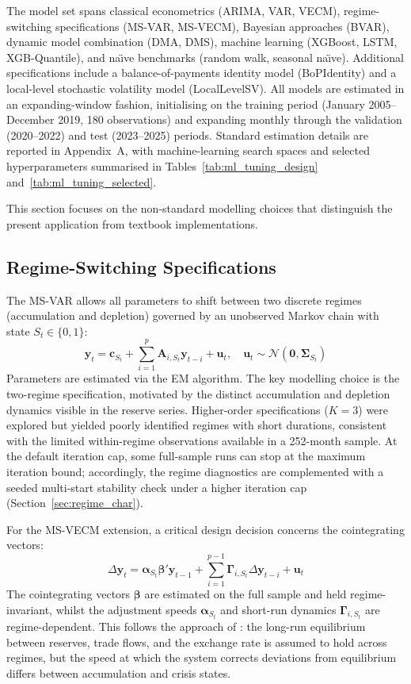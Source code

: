 \documentclass[12pt,a4paper]{article}
\begin{document}
The model set spans classical econometrics (ARIMA, VAR, VECM), regime-switching specifications (MS-VAR, MS-VECM), Bayesian approaches (BVAR), dynamic model combination (DMA, DMS), machine learning (XGBoost, LSTM, XGB-Quantile), and na\"{\i}ve benchmarks (random walk, seasonal na\"{\i}ve). Additional specifications include a balance-of-payments identity model (BoPIdentity) and a local-level stochastic volatility model (LocalLevelSV). All models are estimated in an expanding-window fashion, initialising on the training period (January 2005--December 2019, 180 observations) and expanding monthly through the validation (2020--2022) and test (2023--2025) periods. Standard estimation details are reported in Appendix~A, with machine-learning search spaces and selected hyperparameters summarised in Tables~\ref{tab:ml_tuning_design} and~\ref{tab:ml_tuning_selected}.

This section focuses on the non-standard modelling choices that distinguish the present application from textbook implementations.

\subsection{Regime-Switching Specifications}

The MS-VAR allows all parameters to shift between two discrete regimes (accumulation and depletion) governed by an unobserved Markov chain with state $S_t \in \{0, 1\}$:
\[
\mathbf{y}_t = \mathbf{c}_{S_t} + \sum_{i=1}^{p} \mathbf{A}_{i,S_t} \mathbf{y}_{t-i} + \mathbf{u}_t, \quad \mathbf{u}_t \sim \mathcal{N}(\mathbf{0}, \boldsymbol{\Sigma}_{S_t})
\]
Parameters are estimated via the EM algorithm. The key modelling choice is the two-regime specification, motivated by the distinct accumulation and depletion dynamics visible in the reserve series. Higher-order specifications ($K = 3$) were explored but yielded poorly identified regimes with short durations, consistent with the limited within-regime observations available in a 252-month sample. At the default iteration cap, some full-sample runs can stop at the maximum iteration bound; accordingly, the regime diagnostics are complemented with a seeded multi-start stability check under a higher iteration cap (Section~\ref{sec:regime_char}).

For the MS-VECM extension, a critical design decision concerns the cointegrating vectors:
\[
\Delta \mathbf{y}_t = \boldsymbol{\alpha}_{S_t} \boldsymbol{\beta}' \mathbf{y}_{t-1} + \sum_{i=1}^{p-1} \boldsymbol{\Gamma}_{i,S_t} \Delta \mathbf{y}_{t-i} + \mathbf{u}_t
\]
The cointegrating vectors $\boldsymbol{\beta}$ are estimated on the full sample and held regime-invariant, whilst the adjustment speeds $\boldsymbol{\alpha}_{S_t}$ and short-run dynamics $\boldsymbol{\Gamma}_{i,S_t}$ are regime-dependent. This follows the approach of \cite{Krolzig1997}: the long-run equilibrium between reserves, trade flows, and the exchange rate is assumed to hold across regimes, but the speed at which the system corrects deviations from equilibrium differs between accumulation and crisis states.
\end{document}
